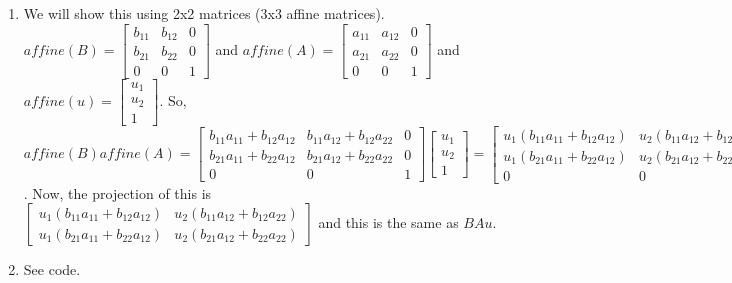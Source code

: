 \documentclass{article}
\begin{document}
\begin{enumerate}
	\item We will show this using 2x2 matrices (3x3 affine matrices). \\
	$affine(B) = 
	\begin{bmatrix}
		b_{11}	&b_{12}	&0\\
		b_{21}	&b_{22}	&0\\
		0	&0	&1
	\end{bmatrix}
	$ and $ affine(A) = 
	\begin{bmatrix}
		a_{11}	&a_{12}	&0\\
		a_{21}	&a_{22}	&0\\
		0	&0	&1	
	\end{bmatrix}
	$ and $ affine(u) = 
	\begin{bmatrix}
		u_1\\
		u_2\\
		1
	\end{bmatrix}
	$. So, $ affine(B) affine(A) = 
	\begin{bmatrix}
		b_{11}a_{11} + b_{12}a_{12}	&b_{11}a_{12} + b_{12}a_{22}	&0\\
		b_{21}a_{11} + b_{22}a_{12}	&b_{21}a_{12} + b_{22}a_{22}	&0\\
		0	&0	&1
	\end{bmatrix}
	\begin{bmatrix}
		u_1\\
		u_2\\
		1
	\end{bmatrix}
	= 
	\begin{bmatrix}
		u_1(b_{11}a_{11} + b_{12}a_{12})	&u_2(b_{11}a_{12} + b_{12}a_{22})	&0\\
		u_1(b_{21}a_{11} + b_{22}a_{12})	&u_2(b_{21}a_{12} + b_{22}a_{22})	&0\\
		0	&0	&1
	\end{bmatrix}
	$. Now, the projection of this is $
	\begin{bmatrix}
		u_1(b_{11}a_{11} + b_{12}a_{12})	&u_2(b_{11}a_{12} + b_{12}a_{22})\\
		u_1(b_{21}a_{11} + b_{22}a_{12})	&u_2(b_{21}a_{12} + b_{22}a_{22})
	\end{bmatrix}
	$ and this is the same as $BAu$. 
	
	\item See code.
	

\end{enumerate}
\end{document}
